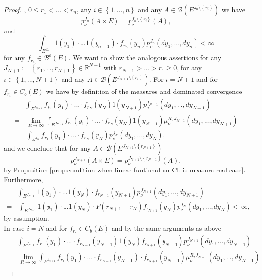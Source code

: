 \documentclass[a4paper,12pt]{article}
\theoremstyle{definition}
\theoremstyle{remark}
\numberwithin{equation}{section}
\numberwithin{theorem}{section}
\begin{document}
\begin{proof}
, $0\leq r_{1}<...<r_{n}$, any $i\in\left\{ 1,...,n\right\} $
and any $A\in\mathcal{B}\left(E^{J_{n}\setminus\left\{ r_{i}\right\} }\right)$ we have
\[
p_{\nu}^{J_{n}}(A\times E)=p_{\nu}^{J_{n}\setminus\left\{ r_{i}\right\} }(A),
\]
and 
\[
\int_{E^{J_n}}1(y_{1})\cdot...1(y_{n-1})\cdot f_{r_{n}}(y_{n})p_{\nu}^{J_{n}}(dy_{1},...,dy_{n})<\infty
\]
for any $f_{r_{n}}\in\mathscr{B}^{\rho}(E)$.
 We want to show the analogous assertions for any $J_{N+1}:=\left\{ r_{1},...,r_{N+1}\right\} \in\mathbb{R}_{+}^{N+1}$ with $r_{N+1}>...>r_{1}\geq0$,  for any $i\in\left\{ 1,...,N+1\right\} $
and any $A\in\mathcal{B}\left(E^{J_{N+1}\setminus\left\{ r_{i}\right\} }\right)$.
For  $i=N+1$ and for $f_{r_{i}}\in C_b(E)$  we have by definition of the measures and dominated convergence
\begin{align*}
 & \int_{E^{J_{N+1}}}f_{r_{1}}(y_{1})\cdot...\cdot f_{r_{N}}(y_{N})1(y_{N+1})p_{\nu}^{J_{N+1}}(dy_{1},...,dy_{N+1})\\
 = & \,\underset{R\rightarrow\infty}{\lim}\int_{E^{J_{N+1}}}f_{r_{1}}(y_{1})\cdot...\cdot f_{r_{N}}(y_{N})1(y_{N+1})\mu_{\nu}^{R,J_{N+1}}(dy_{1},...,dy_{N+1})\\
 =& \,\int_{E^{J_{N}}}f_{r_{1}}(y_{1})\cdot...\cdot f_{r_{N}}(y_{N})p_{\nu}^{J_{N}}(dy_{1},...,dy_{N}),
\end{align*}
and we conclude that for any $A\in\mathcal{B}\left(E^{J_{N+1}\setminus\left\{ r_{N+1}\right\} }\right)$
\[
p_{\nu}^{J_{N+1}}(A\times E)=p_{\nu}^{J_{N+1}\setminus\left\{ r_{N+1}\right\} }(A),
\]
by  Proposition \ref{prop:condition when linear funtional on Cb is measure real case}.
Furthermore, 
\begin{align*}
 & \int_{E^{J_{N+1}}}1(y_{1})\cdot...1(y_{N})\cdot f_{r_{N+1}}(y_{N+1})p_{\nu}^{J_{N+1}}(dy_{1},...,dy_{N+1})\\
 =& \,\int_{E^{J_{N+1}}}1(y_{1})\cdot...1(y_{N})\cdot P(r_{N+1}-r_{N})f_{r_{N+1}}(y_{N})p_{\nu}^{J_{N}}(dy_{1},...,dy_{N})
 < \,\infty,
\end{align*}
by assumption.\\
In case $i=N$ and for $f_{r_{i}}\in C_{b}(E)$ and by the same arguments as above 
\begin{align*}
 & \int_{E^{J_ {N+1}}}f_{r_{1}}(y_{1})\cdot...\cdot f_{r_{N-1}}(y_{N-1})1(y_{N})f_{r_{N+1}}(y_{N+1})p_{\nu}^{J_{N+1}}(dy_{1},...,dy_{N+1})\\
 =& \,\underset{R\rightarrow\infty}{\lim}\int_{E^{J_ {N+1}}}f_{r_{1}}(y_{1})\cdot...\cdot f_{r_{N-1}}(y_{N-1})\cdot f_{r_{N+1}}(y_{N+1})\mu_{\nu}^{R,J_{N+1}}(dy_{1},...,dy_{N+1})\\

\end{align*}
\end{proof}
\end{document}
